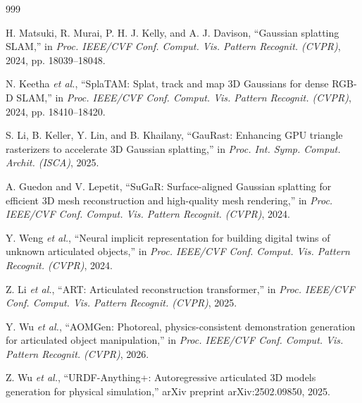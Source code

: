 \documentclass[12pt,a4paper,oneside]{report}
\begin{document}
\begin{thebibliography}{999}

H. Matsuki, R. Murai, P. H. J. Kelly, and A. J. Davison, ``Gaussian splatting {SLAM},'' in \textit{Proc. IEEE/CVF Conf. Comput. Vis. Pattern Recognit. (CVPR)}, 2024, pp. 18039--18048.




N. Keetha \textit{et al.}, ``{SplaTAM}: Splat, track and map {3D} Gaussians for dense {RGB-D SLAM},'' in \textit{Proc. IEEE/CVF Conf. Comput. Vis. Pattern Recognit. (CVPR)}, 2024, pp. 18410--18420.




S. Li, B. Keller, Y. Lin, and B. Khailany, ``{GauRast}: Enhancing {GPU} triangle rasterizers to accelerate {3D} Gaussian splatting,'' in \textit{Proc. Int. Symp. Comput. Archit. (ISCA)}, 2025.




A. Guedon and V. Lepetit, ``{SuGaR}: Surface-aligned {Gaussian} splatting for efficient {3D} mesh reconstruction and high-quality mesh rendering,'' in \textit{Proc. IEEE/CVF Conf. Comput. Vis. Pattern Recognit. (CVPR)}, 2024.





Y. Weng \textit{et al.}, ``Neural implicit representation for building digital twins of unknown articulated objects,'' in \textit{Proc. IEEE/CVF Conf. Comput. Vis. Pattern Recognit. (CVPR)}, 2024.




Z. Li \textit{et al.}, ``{ART}: Articulated reconstruction transformer,'' in \textit{Proc. IEEE/CVF Conf. Comput. Vis. Pattern Recognit. (CVPR)}, 2025.




Y. Wu \textit{et al.}, ``{AOMGen}: Photoreal, physics-consistent demonstration generation for articulated object manipulation,'' in \textit{Proc. IEEE/CVF Conf. Comput. Vis. Pattern Recognit. (CVPR)}, 2026.




Z. Wu \textit{et al.}, ``{URDF-Anything+}: Autoregressive articulated {3D} models generation for physical simulation,'' arXiv preprint arXiv:2502.09850, 2025.




\end{thebibliography}
\end{document}
